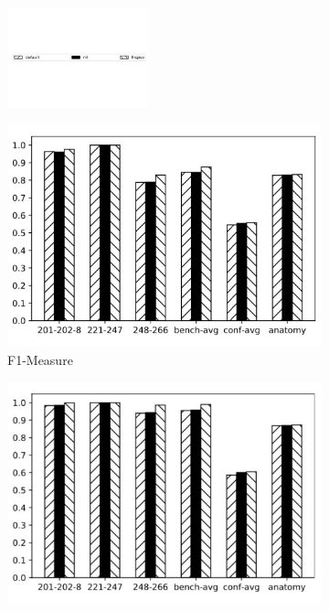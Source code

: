 \documentclass[twoside]{article}
\begin{document}
\begin{figure}[htb!]\centering
\begin{subfigure}{\textwidth}
	\centering
\includegraphics[width=0.45\textwidth]{figures/t_legend.pdf}
\end{subfigure}
\begin{subfigure}{0.3\textwidth}
	\centering
\includegraphics[width=\textwidth]{data_figs/MulRegress_Lily_F1.pdf}
\caption{F1-Measure}
\label{fig:MultiRegress_Lily_F1}
\end{subfigure}
\begin{subfigure}{0.3\textwidth}
	\centering
\includegraphics[width=\textwidth]{data_figs/MulRegress_Lily_P.pdf}

\end{subfigure}
\end{figure}
\end{document}
